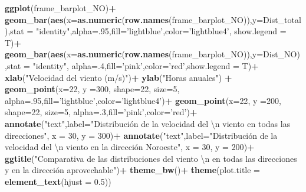 \documentclass[]{article}
\newenvironment{Shaded}{\begin{snugshade}}{\end{snugshade}}
\newcommand{\KeywordTok}[1]{\textcolor[rgb]{0.13,0.29,0.53}{\textbf{#1}}}
\newcommand{\DataTypeTok}[1]{\textcolor[rgb]{0.13,0.29,0.53}{#1}}
\newcommand{\DecValTok}[1]{\textcolor[rgb]{0.00,0.00,0.81}{#1}}
\newcommand{\FloatTok}[1]{\textcolor[rgb]{0.00,0.00,0.81}{#1}}
\newcommand{\CharTok}[1]{\textcolor[rgb]{0.31,0.60,0.02}{#1}}
\newcommand{\StringTok}[1]{\textcolor[rgb]{0.31,0.60,0.02}{#1}}
\newcommand{\OperatorTok}[1]{\textcolor[rgb]{0.81,0.36,0.00}{\textbf{#1}}}
\newcommand{\NormalTok}[1]{#1}
\begin{document}
\begin{Shaded}
\begin{Highlighting}[]
{{{\KeywordTok{ggplot}\NormalTok{(frame_barplot_NO)}\OperatorTok{+}
\StringTok{  }\KeywordTok{geom_bar}\NormalTok{(}\KeywordTok{aes}\NormalTok{(}\DataTypeTok{x=}\KeywordTok{as.numeric}\NormalTok{(}\KeywordTok{row.names}\NormalTok{(frame_barplot_NO)),}\DataTypeTok{y=}\NormalTok{Dist_total),}\DataTypeTok{stat =} \StringTok{"identity"}\NormalTok{,}\DataTypeTok{alpha=}\NormalTok{.}\DecValTok{95}\NormalTok{,}\DataTypeTok{fill=}\StringTok{'lightblue'}\NormalTok{,}\DataTypeTok{color=}\StringTok{'lightblue4'}\NormalTok{, }\DataTypeTok{show.legend =}\NormalTok{ T)}\OperatorTok{+}
\StringTok{  }\KeywordTok{geom_bar}\NormalTok{(}\KeywordTok{aes}\NormalTok{(}\DataTypeTok{x=}\KeywordTok{as.numeric}\NormalTok{(}\KeywordTok{row.names}\NormalTok{(frame_barplot_NO)),}\DataTypeTok{y=}\NormalTok{Dist_NO),}\DataTypeTok{stat =} \StringTok{"identity"}\NormalTok{, }\DataTypeTok{alpha=}\NormalTok{.}\DecValTok{4}\NormalTok{,}\DataTypeTok{fill=}\StringTok{'pink'}\NormalTok{,}\DataTypeTok{color=}\StringTok{'red'}\NormalTok{,}\DataTypeTok{show.legend =}\NormalTok{ T)}\OperatorTok{+}
\StringTok{  }\KeywordTok{xlab}\NormalTok{(}\StringTok{"Velocidad del viento (m/s)"}\NormalTok{)}\OperatorTok{+}
\StringTok{  }\KeywordTok{ylab}\NormalTok{(}\StringTok{"Horas anuales"}\NormalTok{) }\OperatorTok{+}
\StringTok{  }\KeywordTok{geom_point}\NormalTok{(}\DataTypeTok{x=}\DecValTok{22}\NormalTok{, }\DataTypeTok{y =}\DecValTok{300}\NormalTok{, }\DataTypeTok{shape=}\DecValTok{22}\NormalTok{, }\DataTypeTok{size=}\DecValTok{5}\NormalTok{, }\DataTypeTok{alpha=}\NormalTok{.}\DecValTok{95}\NormalTok{,}\DataTypeTok{fill=}\StringTok{'lightblue'}\NormalTok{,}\DataTypeTok{color=}\StringTok{'lightblue4'}\NormalTok{)}\OperatorTok{+}
\StringTok{  }\KeywordTok{geom_point}\NormalTok{(}\DataTypeTok{x=}\DecValTok{22}\NormalTok{, }\DataTypeTok{y =}\DecValTok{200}\NormalTok{, }\DataTypeTok{shape=}\DecValTok{22}\NormalTok{, }\DataTypeTok{size=}\DecValTok{5}\NormalTok{, }\DataTypeTok{alpha=}\NormalTok{.}\DecValTok{3}\NormalTok{,}\DataTypeTok{fill=}\StringTok{'pink'}\NormalTok{,}\DataTypeTok{color=}\StringTok{'red'}\NormalTok{)}\OperatorTok{+}
\StringTok{  }\KeywordTok{annotate}\NormalTok{(}\StringTok{"text"}\NormalTok{,}\DataTypeTok{label=}\StringTok{"Distribución de la velocidad del }\CharTok{\textbackslash{}n}\StringTok{ viento en todas las direcciones"}\NormalTok{, }\DataTypeTok{x =} \DecValTok{30}\NormalTok{, }\DataTypeTok{y =} \DecValTok{300}\NormalTok{)}\OperatorTok{+}
\StringTok{  }\KeywordTok{annotate}\NormalTok{(}\StringTok{"text"}\NormalTok{,}\DataTypeTok{label=}\StringTok{"Distribución de la velocidad del }\CharTok{\textbackslash{}n}\StringTok{ viento en la dirección Noroeste"}\NormalTok{, }\DataTypeTok{x =} \DecValTok{30}\NormalTok{, }\DataTypeTok{y =} \DecValTok{200}\NormalTok{)}\OperatorTok{+}
\StringTok{  }\KeywordTok{ggtitle}\NormalTok{(}\StringTok{"Comparativa de las distribuciones del viento }\CharTok{\textbackslash{}n}\StringTok{ en todas las direcciones y en la dirección aprovechable"}\NormalTok{)}\OperatorTok{+}
\StringTok{  }\KeywordTok{theme_bw}\NormalTok{()}\OperatorTok{+}
\StringTok{  }\KeywordTok{theme}\NormalTok{(}\DataTypeTok{plot.title =} \KeywordTok{element_text}\NormalTok{(}\DataTypeTok{hjust =} \FloatTok{0.5}\NormalTok{))}


}}}
\end{Highlighting}
\end{Shaded}
\end{document}
